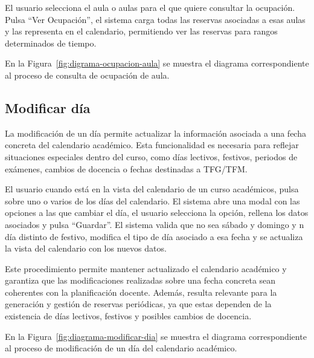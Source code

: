 El usuario selecciona el aula o aulas para el que quiere consultar la ocupación. Pulsa ``Ver Ocupación'', el sistema carga todas las reservas asociadas a esas aulas y las representa en el calendario, permitiendo ver las reservas para rangos determinados de tiempo.

En la Figura~\ref{fig:digrama-ocupacion-aula} se muestra el diagrama correspondiente al proceso de consulta de ocupación de aula.


\subsection{Modificar día}

La modificación de un día permite actualizar la información asociada a una fecha concreta del calendario académico. Esta funcionalidad es necesaria para reflejar situaciones especiales dentro del curso, como días lectivos, festivos, periodos de exámenes, cambios de docencia o fechas destinadas a TFG/TFM.

El usuario cuando está en la vista del calendario de un curso académicos, pulsa sobre uno o varios de los días del calendario. El sistema abre una modal con las opciones a las que cambiar el día, el usuario selecciona la opción, rellena los datos asociados y pulsa ``Guardar''. El sistema valida que no sea sábado y domingo y n día distinto de festivo, modifica el tipo de día asociado a esa fecha y se actualiza la vista del calendario con los nuevos datos.

Este procedimiento permite mantener actualizado el calendario académico y garantiza que las modificaciones realizadas sobre una fecha concreta sean coherentes con la planificación docente. Además, resulta relevante para la generación y gestión de reservas periódicas, ya que estas dependen de la existencia de días lectivos, festivos y posibles cambios de docencia.

En la Figura~\ref{fig:diagrama-modificar-dia} se muestra el diagrama correspondiente al proceso de modificación de un día del calendario académico.


